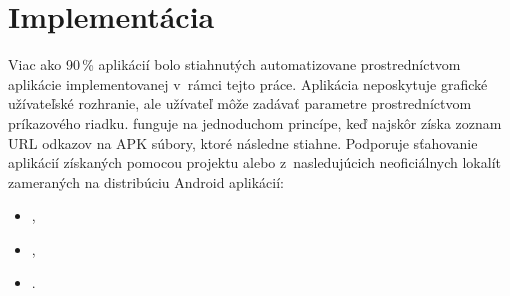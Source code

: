 \section{Implementácia}
Viac ako 90\,\% aplikácií bolo stiahnutých automatizovane prostredníctvom aplikácie  implementovanej v~rámci tejto práce. Aplikácia neposkytuje grafické užívateľské rozhranie, ale užívateľ môže zadávať parametre prostredníctvom príkazového riadku.  funguje na jednoduchom princípe, keď najskôr získa zoznam URL odkazov na APK súbory, ktoré následne stiahne. Podporuje sťahovanie aplikácií získaných pomocou projektu  alebo z~nasledujúcich neoficiálnych lokalít zameraných na distribúciu Android aplikácií: 
\begin{itemize}
 \item {},
 \item {},
 \item {}.
\end{itemize}

